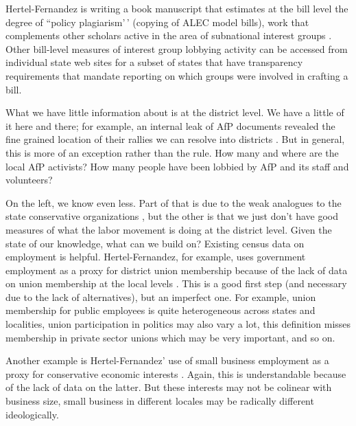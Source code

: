 \documentclass[
  oneside]{book}
\begin{document}
Hertel-Fernandez is writing a book manuscript that estimates at the bill level the degree of ``policy plagiarism'\,' (copying of ALEC model bills), work that complements other scholars active in the area of subnational interest groups \citep{Kroeger:2016, Jansa:2015}. Other bill-level measures of interest group lobbying activity can be accessed from individual state web sites for a subset of states that have transparency requirements that mandate reporting on which groups were involved in crafting a bill.

What we have little information about is at the district level. We have a little of it here and there; for example, an internal leak of AfP documents revealed the fine grained location of their rallies we can resolve into districts \citep{Hertel-Fernandez:2018}. But in general, this is more of an exception rather than the rule. How many and where are the local AfP activists? How many people have been lobbied by AfP and its staff and volunteers?

On the left, we know even less. Part of that is due to the weak analogues to the state conservative organizations \citep{Hertel-Fernandez:2016a}, but the other is that we just don't have good measures of what the labor movement is doing at the district level. Given the state of our knowledge, what can we build on? Existing census data on employment is helpful. Hertel-Fernandez, for example, uses government employment as a proxy for district union membership because of the lack of data on union membership at the local levels \citep{Hertel-Fernandez:2018}. This is a good first step (and necessary due to the lack of alternatives), but an imperfect one. For example, union membership for public employees is quite heterogeneous across states and localities, union participation in politics may also vary a lot, this definition misses membership in private sector unions which may be very important, and so on.

Another example is Hertel-Fernandez' use of small business employment as a proxy for conservative economic interests \citep{Hertel-Fernandez:2018}. Again, this is understandable because of the lack of data on the latter. But these interests may not be colinear with business size, small business in different locales may be radically different ideologically.
\end{document}
